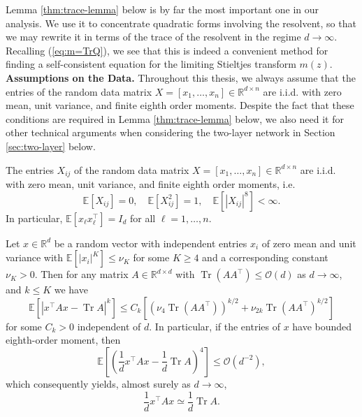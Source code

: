 \documentclass{article}
\begin{document}
\bigskip
\par
Lemma \ref{thm:trace-lemma} below is by far the most important one in our analysis. We use it to concentrate quadratic forms involving the resolvent, so that we may rewrite it in terms of the trace of the resolvent in the regime $d\to\infty$. Recalling (\ref{eq:m=TrQ}), we see that this is indeed a convenient method for finding a self-consistent equation for the limiting Stieltjes transform $m(z)$.
\bigskip
\bigskip
\\
\textbf{Assumptions on the Data.} Throughout this thesis, we always assume that the entries of the random data matrix $X=[x_1,\dots,x_n]\in\mathbb{R}^{d\times n}$ are i.i.d. with zero mean, unit variance, and finite eighth order moments. Despite the fact that these conditions are required in Lemma \ref{thm:trace-lemma} below, we also need it for other technical arguments when considering the two-layer network in Section \ref{sec:two-layer} below.
\bigskip
\begin{assumption}\label{ass:data}
The entries $X_{ij}$ of the random data matrix $X=[x_1,\dots,x_n]\in\mathbb{R}^{d\times n}$ are i.i.d. with zero mean, unit variance, and finite eighth order moments, i.e.
$$\mathbb{E}[X_{ij}]=0,\quad \mathbb{E}[X_{ij}^2]=1,\quad \mathbb{E}[|X_{ij}|^8]<\infty.$$
In particular, $\mathbb{E}[x_\ell x_\ell^\top]=I_d$ for all $\ell=1,\dots,n$.
\end{assumption}
\bigskip
\noindent
\begin{lemma}\label{thm:trace-lemma}
Let $x\in\mathbb{R}^d$ be a random vector with independent entries $x_i$ of zero mean and unit variance with $\mathbb{E}[|x_i|^K]\leq\nu_K$ for some $K\geq 4$ and a corresponding constant $\nu_K>0$. Then for any matrix $A\in\mathbb{R}^{d\times d}$ with $\operatorname{Tr}(AA^\top)\leq\mathcal{O}(d)$ as $d\to\infty$, and $k\leq K$ we have
$$\mathbb{E}\left[\left|x^\top A x-\operatorname{Tr}A\right|^k\right]\leq C_k\left[\left(\nu_4\operatorname{Tr}(AA^\top)\right)^{k/2}+\nu_{2k}\operatorname{Tr}\left(AA^\top\right)^{k/2}\right]$$
for some $C_k>0$ independent of $d$. In particular, if the entries of $x$ have bounded eighth-order moment, then
$$\mathbb{E}\left[\left(\frac{1}{d}x^\top Ax-\frac{1}{d}\operatorname{Tr}A\right)^4\right]\leq\mathcal{O}(d^{-2}),$$
which consequently yields, almost surely as $d\to\infty$,
$$\frac{1}{d}x^\top Ax\simeq\frac{1}{d}\operatorname{Tr}A.$$
\end{lemma}
\bigskip
\par
\end{document}
